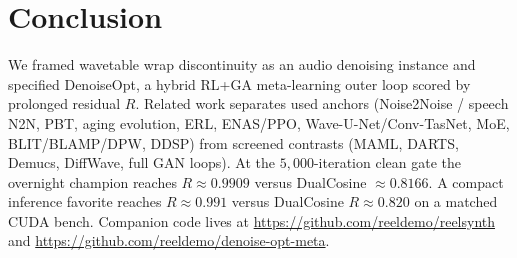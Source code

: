 \section{Conclusion}
\label{sec:conclusion}

We framed wavetable wrap discontinuity as an audio denoising instance and specified DenoiseOpt, a hybrid RL+GA meta-learning outer loop scored by prolonged residual $R$.
Related work separates used anchors (Noise2Noise / speech N2N, PBT, aging evolution, ERL, ENAS/PPO, Wave-U-Net/Conv-TasNet, MoE, BLIT/BLAMP/DPW, DDSP) from screened contrasts (MAML, DARTS, Demucs, DiffWave, full GAN loops).
At the $5{,}000$-iteration clean gate the overnight champion reaches $R\approx 0.9909$ versus DualCosine $\approx 0.8166$.
A compact inference favorite reaches $R\approx 0.991$ versus DualCosine $R\approx 0.820$ on a matched CUDA bench.
Companion code lives at \url{https://github.com/reeldemo/reelsynth} and \url{https://github.com/reeldemo/denoise-opt-meta}.

